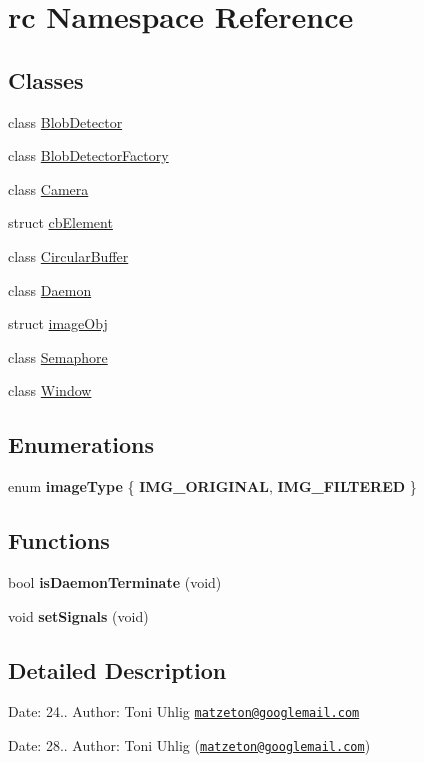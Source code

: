 \hypertarget{namespacerc}{\section{rc Namespace Reference}
\label{namespacerc}
}
\subsection*{Classes}
\begin{DoxyCompactItemize}
\item 
class \hyperlink{classrc_1_1BlobDetector}{Blob\+Detector}
\item 
class \hyperlink{classrc_1_1BlobDetectorFactory}{Blob\+Detector\+Factory}
\item 
class \hyperlink{classrc_1_1Camera}{Camera}
\item 
struct \hyperlink{structrc_1_1cbElement}{cb\+Element}
\item 
class \hyperlink{classrc_1_1CircularBuffer}{Circular\+Buffer}
\item 
class \hyperlink{classrc_1_1Daemon}{Daemon}
\item 
struct \hyperlink{structrc_1_1imageObj}{image\+Obj}
\item 
class \hyperlink{classrc_1_1Semaphore}{Semaphore}
\item 
class \hyperlink{classrc_1_1Window}{Window}
\end{DoxyCompactItemize}
\subsection*{Enumerations}
\begin{DoxyCompactItemize}
\item 
\hypertarget{namespacerc_a7be67fa6e9ec3e19fcc2df0777ab42fe}{enum {\bfseries image\+Type} \{ {\bfseries I\+M\+G\+\_\+\+O\+R\+I\+G\+I\+N\+A\+L}, 
{\bfseries I\+M\+G\+\_\+\+F\+I\+L\+T\+E\+R\+E\+D}
 \}}\label{namespacerc_a7be67fa6e9ec3e19fcc2df0777ab42fe}

\end{DoxyCompactItemize}
\subsection*{Functions}
\begin{DoxyCompactItemize}
\item 
\hypertarget{namespacerc_a793e3f430d5b5c99fe110a6a14ffcc6b}{bool {\bfseries is\+Daemon\+Terminate} (void)}\label{namespacerc_a793e3f430d5b5c99fe110a6a14ffcc6b}

\item 
\hypertarget{namespacerc_a394315bf537365634692ccb2bc32b287}{void {\bfseries set\+Signals} (void)}\label{namespacerc_a394315bf537365634692ccb2bc32b287}

\end{DoxyCompactItemize}


\subsection{Detailed Description}
Date\+: 24.. Author\+: Toni Uhlig \href{mailto:matzeton@googlemail.com}{\tt matzeton@googlemail.\+com}

Date\+: 28.. Author\+: Toni Uhlig (\href{mailto:matzeton@googlemail.com}{\tt matzeton@googlemail.\+com}) 